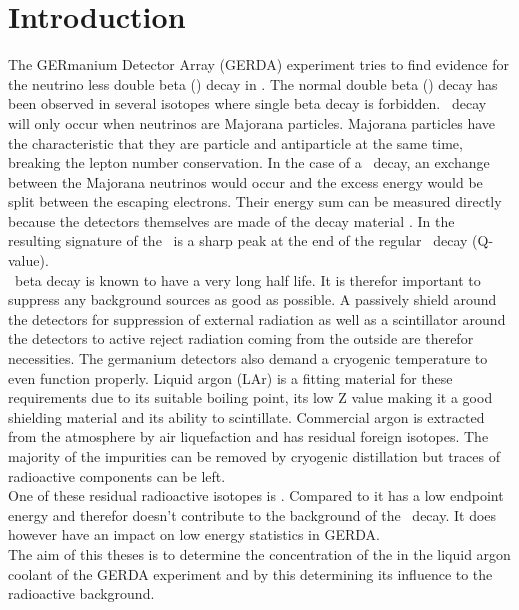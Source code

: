 \documentclass[encoding=utf8,british]{tumphthesis}
\begin{document}
\tableofcontents

\mainmatter

\chapter{Introduction}
\label{sec:intro}

The GERmanium Detector Array (GERDA) experiment tries to find evidence for the neutrino less double beta (\onbb) decay in .
The normal double beta (\twonu) decay has been observed in several isotopes where single beta decay is forbidden.
\onbb\ decay will only occur when neutrinos are Majorana particles.
Majorana particles have the characteristic that they are particle and antiparticle at the same time, breaking the lepton number conservation.
In the case of a \onbb\ decay, an exchange between the Majorana neutrinos would occur and the excess energy would be split  between the escaping electrons.
Their energy sum can be measured directly because the detectors themselves are made of the  decay material .
In the resulting signature of the \onbb\ is a sharp peak at the end of the regular \twonu\ decay (Q-value).
\\

\onbb\ beta decay is known to have a  very long half life.
It is therefor important to suppress any background sources as good as possible. 
A passively shield around the detectors for suppression of external radiation as well as a scintillator around the detectors to active reject radiation coming from the outside are therefor necessities.
The germanium detectors also demand a cryogenic temperature to even function properly.
Liquid argon (LAr) is a fitting material for these requirements due to its suitable boiling point, its low Z value making it a good shielding material and its ability to scintillate. 
Commercial argon is extracted from the atmosphere by air liquefaction and has residual foreign isotopes. 
The majority of the impurities can be removed by cryogenic distillation but traces of radioactive components can be left.
\\

One of these residual radioactive isotopes is \Kr. 
Compared to  it has a low endpoint energy and therefor doesn't contribute to the background of the \onbb\ decay.
It does however have an impact on low energy statistics in GERDA.
\\

The aim of this theses is to determine the concentration of the \Kr in the liquid argon coolant of the GERDA experiment and by this determining its influence to the radioactive background. 
\\
\end{document}
